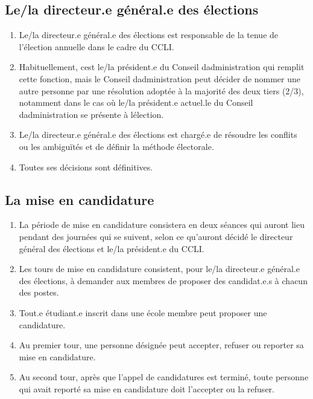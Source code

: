 \subsection{Le/la directeur.e général.e des élections}
\label{le-la-directeur-e-general-e-des-elections}

\begin{enumerate}
 \item
  Le/la directeur.e général.e des élections est responsable de la tenue de l'élection annuelle dans le cadre du CCLI.
 \item
  Habituellement, c\textquotesingle est le/la président.e du Conseil d\textquotesingle administration qui remplit cette fonction, mais le Conseil d\textquotesingle administration peut décider de nommer une autre personne par une résolution adoptée à la majorité des deux tiers (2/3), notamment dans le cas où le/la président.e actuel.le du Conseil d\textquotesingle administration se présente à l\textquotesingle élection.
 \item
  Le/la directeur.e général.e des élections est chargé.e de résoudre les conflits ou les ambiguïtés et de définir la méthode électorale.
 \item
  Toutes ses décisions sont définitives.
\end{enumerate}

\subsection{La mise en candidature}
\label{la-mise-en-candidature}

\begin{enumerate}
 \item
  La période de mise en candidature consistera en deux séances qui auront lieu pendant des journées qui se suivent, selon ce qu'auront décidé le directeur général des élections et le/la président.e du CCLI.
 \item
  Les tours de mise en candidature consistent, pour le/la directeur.e général.e des élections, à demander aux membres de proposer des candidat.e.s à chacun des postes.
 \item
  Tout.e étudiant.e inscrit dans une école membre peut proposer une candidature.
 \item
  Au premier tour, une personne désignée peut accepter, refuser ou reporter sa mise en candidature.
 \item
  Au second tour, après que l'appel de candidatures est terminé, toute personne qui avait reporté sa mise en candidature doit l'accepter ou la refuser.
\end{enumerate}

